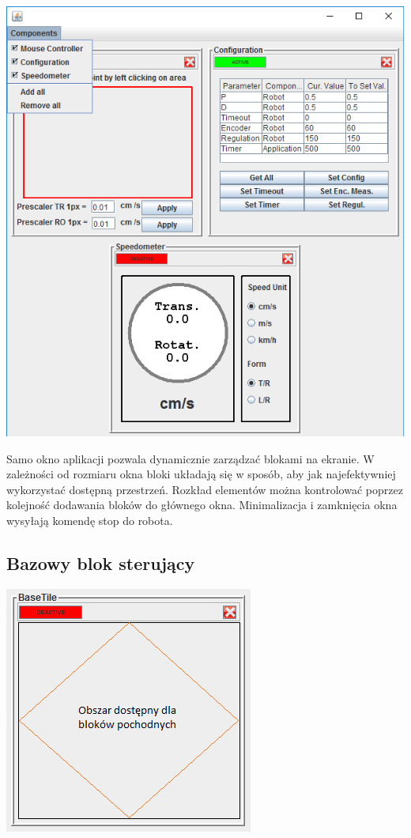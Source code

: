 \documentclass[eng,printmode]{mgr}
\begin{document}
\begin{center}
  \includegraphics{images/metro_all}
\end{center}

Samo okno aplikacji pozwala dynamicznie zarządzać blokami na ekranie. W zależności od rozmiaru okna bloki układają się w sposób, aby jak najefektywniej wykorzystać dostępną przestrzeń. Rozkład elementów można kontrolować poprzez kolejność dodawania bloków do głównego okna. Minimalizacja i zamknięcia okna wysyłają komendę stop do robota.

 \subsection{Bazowy blok sterujący}

\begin{center}
  \includegraphics{images/bazowy}
\end{center}
\end{document}
